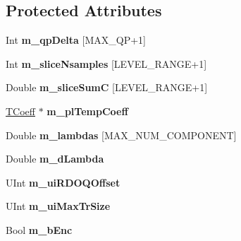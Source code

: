 \subsection*{Protected Attributes}
\begin{DoxyCompactItemize}
\item 
\mbox{\label{class_t_com_tr_quant_a093f5ea34e7829fc459db0e809ba015b}} 
Int {\bfseries m\+\_\+qp\+Delta} \mbox{[}M\+A\+X\+\_\+\+QP+1\mbox{]}
\item 
\mbox{\label{class_t_com_tr_quant_a333d28aef8a5b9a9299986b32a41deca}} 
Int {\bfseries m\+\_\+slice\+Nsamples} \mbox{[}L\+E\+V\+E\+L\+\_\+\+R\+A\+N\+GE+1\mbox{]}
\item 
\mbox{\label{class_t_com_tr_quant_a16da6ae0be268a6d5853aa996f5b21c0}} 
Double {\bfseries m\+\_\+slice\+SumC} \mbox{[}L\+E\+V\+E\+L\+\_\+\+R\+A\+N\+GE+1\mbox{]}
\item 
\mbox{\label{class_t_com_tr_quant_ad36ef5082b4df90a0c798419b92d3924}} 
\hyperlink{_type_def_8h_a5bdd3b17d14ed1978c366d2d958c0300}{T\+Coeff} $\ast$ {\bfseries m\+\_\+pl\+Temp\+Coeff}
\item 
\mbox{\label{class_t_com_tr_quant_ab231dc5ddd760944bac83f85e1644f02}} 
Double {\bfseries m\+\_\+lambdas} \mbox{[}M\+A\+X\+\_\+\+N\+U\+M\+\_\+\+C\+O\+M\+P\+O\+N\+E\+NT\mbox{]}
\item 
\mbox{\label{class_t_com_tr_quant_a5b3f5fb7f8f9127d9c509d078aa797c0}} 
Double {\bfseries m\+\_\+d\+Lambda}
\item 
\mbox{\label{class_t_com_tr_quant_a191866ecaa942370e17b6154f3824c4d}} 
U\+Int {\bfseries m\+\_\+ui\+R\+D\+O\+Q\+Offset}
\item 
\mbox{\label{class_t_com_tr_quant_af828865455ccd06092f702a84e87e07d}} 
U\+Int {\bfseries m\+\_\+ui\+Max\+Tr\+Size}
\item 
\mbox{\label{class_t_com_tr_quant_a0b60c138cd552195f086bb429e930222}} 
Bool {\bfseries m\+\_\+b\+Enc}
\item 

\end{DoxyCompactItemize}
